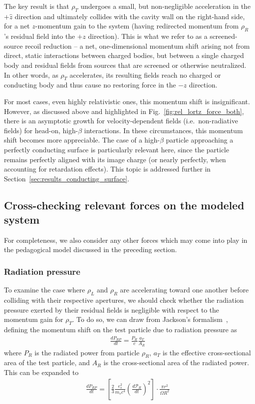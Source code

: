 \documentclass[reprint,
               amsmath,amssymb,nofootinbib, aps%
              ]{revtex4-2}
\begin{document}
The key result is that $\rho_T$ undergoes a small, but non-negligible acceleration in the $+\hat{z}$ direction and ultimately collides with the cavity wall on the right-hand side, for a net $z$-momentum gain to the system (having redirected momentum from $\rho_R$'s residual field into the $+z$ direction). This is what we refer to as a screened-source recoil reduction -- a net, one-dimensional momentum shift arising not from direct, static interactions between charged bodies, but between a single charged body and residual fields from sources that are screened or otherwise neutralized. In other words, as $\rho_T$ accelerates, its resulting fields reach no charged or conducting body and thus cause no restoring force in the $-z$ direction.

For most cases, even highly relativistic ones, this momentum shift is insignificant. However, as discussed above and highlighted in Fig.~\ref{fig:rel_lortz_force_both}, there is an asymptotic growth for velocity-dependent fields (i.e.~non-radiative fields) for head-on, high-$\beta$ interactions. In these circumstances, this momentum shift becomes more appreciable. The case of a high-$\beta$ particle approaching a perfectly conducting surface is particularly relevant here, since the particle remains perfectly aligned with its image charge (or nearly perfectly, when accounting for retardation effects). This topic is addressed further in Section~\ref{sec:results_conducting_surface}.

\subsection{Cross-checking relevant forces on the modeled system}
\vspace{-0.2cm}
For completeness, we also consider any other forces which may come into play in the pedagogical model discussed in the preceding section.
\vspace{-0.2cm}
\subsubsection*{Radiation pressure}
\vspace{-0.2cm}
To examine the case where $\rho_L$ and $\rho_R$ are accelerating toward one another before colliding with their respective apertures, we should check whether the radiation pressure exerted by their residual fields is negligible with respect to the momentum gain for $\rho_T$. To do so, we can draw from Jackson's formalism~\cite{jackson2012classical}, defining the momentum shift on the test particle due to radiation pressure as
\begin{align}
    \frac{dP_{RP}}{dt} = \frac{P_R}{c} \frac{a_T}{A_R}
\end{align}
where $P_R$ is the radiated power from particle $\rho_R$, $a_T$ is the effective cross-sectional area of the test particle, and $A_R$ is the cross-sectional area of the radiated power. This can be expanded to
\begin{align}
    \frac{dP_{RP}}{dt} = \left[\frac{2}{3}\frac{e_s^2}{m_s c^4} \left(\frac{d\mathcal{P}_R}{dt}\right)^2\right] \cdot \frac{\pi r^2}{\Omega R^2}
\end{align}
\end{document}
